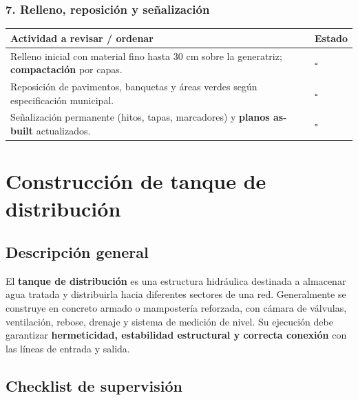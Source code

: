 \documentclass[12pt]{article}
\newcommand{\cbox}{\(\square\)} %
\begin{document}
	\subsubsection*{7. Relleno, reposición y señalización}
	\begin{tabularx}{\linewidth}{>{\raggedright\arraybackslash}p{0.93\linewidth} >{\centering\arraybackslash}m{0.07\linewidth}}
		\toprule
		\textbf{Actividad a revisar / ordenar} & \textbf{Estado}\\
		\midrule
		Relleno inicial con material fino hasta 30 cm sobre la generatriz; \textbf{compactación} por capas. & \cbox \\
		Reposición de pavimentos, banquetas y áreas verdes según especificación municipal. & \cbox \\
		Señalización permanente (hitos, tapas, marcadores) y \textbf{planos as-built} actualizados. & \cbox \\
		\bottomrule
	\end{tabularx}
	

	
	
	
	

		



	
	
	
	
	
	
	
	\section{Construcción de tanque de distribución}
	
	\subsection*{Descripción general}
	El \textbf{tanque de distribución} es una estructura hidráulica destinada a almacenar agua tratada y distribuirla hacia diferentes sectores de una red.  
	Generalmente se construye en concreto armado o mampostería reforzada, con cámara de válvulas, ventilación, rebose, drenaje y sistema de medición de nivel.  
	Su ejecución debe garantizar \textbf{hermeticidad, estabilidad estructural y correcta conexión} con las líneas de entrada y salida.
	
		
	\subsection{Checklist de supervisión}
	
\end{document}
